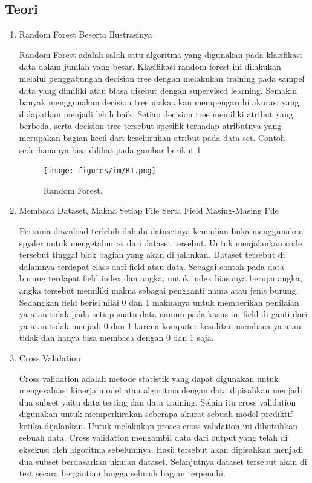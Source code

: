 \subsection{Teori}
\begin{enumerate}
\item Random Forest Beserta Ilustrasinya \par
Random Forest adalah salah satu algoritma yang digunakan pada klasifikasi data dalam jumlah yang besar. Klasifikasi random forest ini dilakukan melalui penggabungan decision tree dengan melakukan training pada sampel data yang dimiliki atau biasa disebut dengan supervised learning. Semakin banyak menggunakan decision tree maka akan mempengaruhi akurasi yang didapatkan menjadi lebih baik. Setiap decision tree memiliki atribut yang berbeda, serta decision tree tersebut spesifik terhadap atributnya yang merupakan bagian kecil dari keseluruhan atribut pada data set. Contoh sederhananya bisa dilihat pada gambar berikut \ref{R1}
		\begin{figure}[ht]
		\centerline{\texttt{[image: figures/im/R1.png]}}
		\caption{Random Forest.}
		\label{R1}
		\end{figure}

\item Membaca Dataset, Makna Setiap File Serta Field Masing-Masing File\par
Pertama download terlebih dahulu datasetnya kemudian buka menggunakan spyder untuk mengetahui isi dari dataset tersebut. Untuk menjalankan code tersebut tinggal blok bagian yang akan di jalankan. Dataset tersebut di dalamnya terdapat class dari field atau data. Sebagai contoh pada data burung terdapat field index dan angka, untuk index biasanya berupa angka, angka tersebut memiliki makna sebagai pengganti nama atau jenis burung. Sedangkan field berisi nilai 0 dan 1 maknanya untuk memberikan penilaian ya atau tidak pada setiap suatu data namun pada kasus ini field di ganti dari ya atau tidak menjadi 0 dan 1 karena komputer kesulitan membaca ya atau tidak dan hanya bisa membaca dengan 0 dan 1 saja.

\item Cross Validation \par
Cross validation adalah metode statistik yang dapat digunakan untuk mengevaluasi kinerja model atau algoritma dengan data dipisahkan menjadi dua subset yaitu data testing dan data training. Selain itu cross validation digunakan untuk memperkirakan seberapa akurat sebuah model prediktif ketika dijalankan. Untuk melakukan proses cross validation ini dibutuhkan sebuah data. Cross validation mengambil data dari output yang telah di eksekusi oleh algoritma sebelumnya. Hasil tersebut akan dipisahkan menjadi dua subset berdasarkan ukuran dataset. Selanjutnya dataset tersebut akan di test secara bergantian hingga seluruh bagian terpenuhi.


\end{enumerate}
